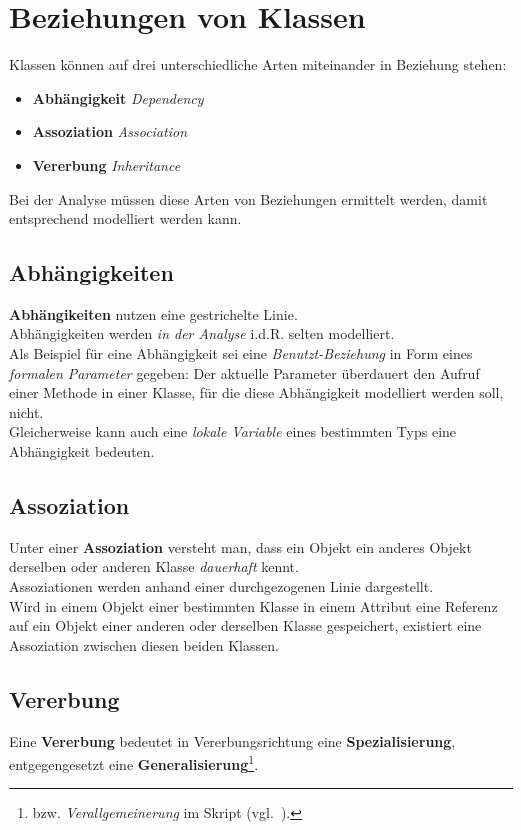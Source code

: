 \section{Beziehungen von Klassen}\label{sec:beziehungen-von-klassen}

Klassen können auf drei unterschiedliche Arten miteinander in Beziehung stehen:

\begin{itemize}
    \item \textbf{Abhängigkeit} \textit{Dependency}
    \item \textbf{Assoziation} \textit{Association}
    \item \textbf{Vererbung} \textit{Inheritance}
\end{itemize}

\noindent
Bei der Analyse müssen diese Arten von Beziehungen ermittelt werden, damit entsprechend modelliert werden kann.\\

\subsection*{Abhängigkeiten}
\textbf{Abhängikeiten} nutzen eine gestrichelte Linie.\\
Abhängigkeiten werden \textit{in der Analyse} i.d.R. selten modelliert.\\
Als Beispiel für eine Abhängigkeit sei eine \textit{Benutzt-Beziehung} in Form eines \textit{formalen Parameter} gegeben: Der aktuelle Parameter überdauert den Aufruf einer Methode in einer Klasse, für die diese Abhängigkeit modelliert werden soll, nicht.\\
Gleicherweise kann auch eine \textit{lokale Variable} eines bestimmten Typs eine Abhängigkeit bedeuten.

\subsection*{Assoziation}
Unter einer \textbf{Assoziation} versteht man, dass ein Objekt ein anderes Objekt derselben oder anderen Klasse \textit{dauerhaft} kennt.\\
Assoziationen werden anhand einer durchgezogenen Linie dargestellt.\\
Wird in einem Objekt einer bestimmten Klasse in einem Attribut eine Referenz auf ein Objekt einer anderen oder derselben Klasse gespeichert, existiert eine Assoziation zwischen diesen beiden Klassen.

\subsection*{Vererbung}
Eine \textbf{Vererbung} bedeutet in Vererbungsrichtung eine \textbf{Spezialisierung}, entgegengesetzt eine \textbf{Generalisierung}\footnote{
bzw. \textit{Verallgemeinerung} im Skript (vgl.~\cite[7]{Wed09b}).
}.

